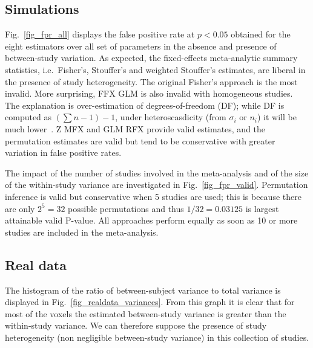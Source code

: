 \documentclass{llncs}
\newcommand{\sampleSize}[1][i]{n_{#1}}
\begin{document}
\subsection{Simulations}
Fig.~\ref{fig_fpr_all} displays the false positive rate at $p<0.05$ obtained for the eight estimators over all set of parameters in the absence and presence of between-study variation. As expected, the fixed-effects meta-analytic summary statistics, i.e.\ Fisher's, Stouffer's and weighted Stouffer's estimates, are liberal in the presence of study heterogeneity. The original Fisher's approach is the most invalid. More surprising, FFX GLM is also invalid with homogeneous studies. The explanation is over-estimation of degrees-of-freedom (DF); while DF is computed as $(\sum n-1)-1$, under heteroscasdicity (from $\sigma_i$ or $\sampleSize$) it will be much lower~\cite{Satterthwaite}. Z MFX and GLM RFX provide valid estimates, and the permutation estimates are valid but tend to be conservative with greater variation in false positive rates.

The impact of the number of studies involved in the meta-analysis and of the size of the within-study variance are investigated in Fig.~\ref{fig_fpr_valid}. Permutation inference is valid but conservative when 5 studies are used; this is because there are only $2^5=32$ possible permutations and thus $1/32=0.03125$ is largest attainable valid P-value. All approaches perform equally as soon as 10 or more studies are included in the meta-analysis. 


\subsection{Real data}



The histogram of the ratio of between-subject variance to total variance is displayed in Fig.~\ref{fig_realdata_variances}. From this graph it is clear that for most of the voxels the estimated between-study variance is greater than the within-study variance. We can therefore suppose the presence of study heterogeneity (non negligible between-study variance) in this collection of studies.
\end{document}
